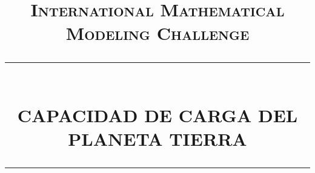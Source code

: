 \documentclass[12pt]{report}
\newcommand{\HRule}[1]{\rule{\linewidth}{#1}}
\begin{document}
\title{ \normalsize \textsc{International Mathematical Modeling Challenge}
		\\ [2.0cm]
		\HRule{2pt} \\ [0.5cm]
		\LARGE \textbf{\uppercase{Capacidad de carga del Planeta Tierra}}
		\HRule{2pt} \\ [0.5cm]}



\maketitle
\singlespace
\renewcommand{\contentsname}{\'Indice} 
\vfill
\tableofcontents
\vfill
\newpage


\sectionfont{\scshape}


\end{document}
